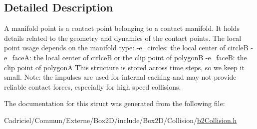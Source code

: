 \subsection{Detailed Description}
A manifold point is a contact point belonging to a contact manifold. It holds details related to the geometry and dynamics of the contact points. The local point usage depends on the manifold type\+: -\/e\+\_\+circles\+: the local center of circleB -\/e\+\_\+faceA\+: the local center of cirlceB or the clip point of polygonB -\/e\+\_\+faceB\+: the clip point of polygonA This structure is stored across time steps, so we keep it small. Note\+: the impulses are used for internal caching and may not provide reliable contact forces, especially for high speed collisions. 

The documentation for this struct was generated from the following file\+:\begin{DoxyCompactItemize}
\item 
Cadriciel/\+Commun/\+Externe/\+Box2\+D/include/\+Box2\+D/\+Collision/\hyperlink{b2_collision_8h}{b2\+Collision.\+h}\end{DoxyCompactItemize}
